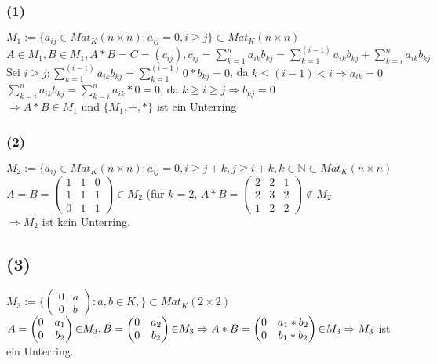 \documentclass[12pt]{article}
\begin{document}
\subsubsection*{(1)}$M_1:=\{a_{ij}{\in}Mat_K(n{\times}n): a_{ij} = 0, i{\geq}j\}\subset Mat_K(n{\times}n)$\\
$A{\in}M_1, B{\in}M_1, A*B=C=(c_{ij}), c_{ij}=\sum_{k=1}^na_{ik}b_{kj}=\sum_{k=1}^{(i-1)}a_{ik}b_{kj}+\sum_{k=i}^na_{ik}b_{kj}$\\
Sei $i{\geq}j: \sum_{k=1}^{(i-1)}a_{ik}b_{kj}=\sum_{k=1}^{(i-1)}0*b_{kj}=0$, da $k{\leq}(i-1)<i \Rightarrow a_{ik}=0$\\
$\sum_{k=i}^{n}a_{ik}b_{kj}=\sum_{k=i}^{n}a_{ik}*0=0$, da $k{\geq}i{\geq}j \Rightarrow b_{kj}=0$\\
$\Rightarrow A*B \in M_1$ und $\{M_1, +, *\}$ ist ein Unterring
\subsubsection*{(2)}$M_2:=\{a_{ij}{\in}Mat_K(n{\times}n): a_{ij}=0, i{\geq}j+k, j{\geq}i+k, k\in\mathbb{N} \subset Mat_K(n{\times}n)$\\
$A=B=\begin{pmatrix}
1 & 1 & 0 \\ 1 & 1 & 1 \\ 0 & 1 & 1
\end{pmatrix} \in M_2$ (f{\"u}r $k=2$,
$A*B=\begin{pmatrix}
2 & 2 & 1 \\ 2 & 3 & 2 \\ 1 & 2 & 2
\end{pmatrix}{\notin}M_2$\\
$\Rightarrow M_2$ ist kein Unterring.
\subsection*{(3)}$M_3:=\{\begin{pmatrix}0 & a \\ 0 & b 	\end{pmatrix}: a,b \in K, \}\subset Mat_K(2\times2)$\\
$A=\begin{pmatrix}0 & a_1 \\ 0 & b_2\end{pmatrix}{\in}M_3, B=\begin{pmatrix}0 & a_2 \\ 0 & b_2\end{pmatrix}{\in}M_3 \Rightarrow A*B= \begin{pmatrix}0 & a_1*b_2 \\ 0 & b_1*b_2\end{pmatrix}{\in}M_3\\
\Rightarrow M_3$ ist ein Unterring.
\end{document}
